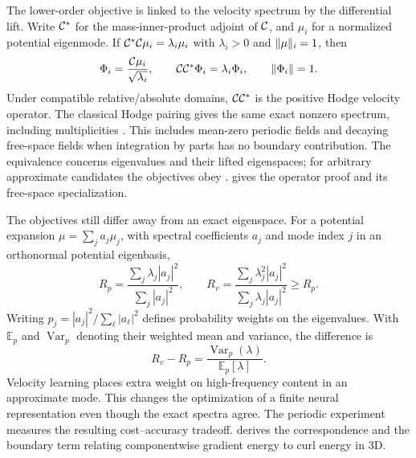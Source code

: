 The lower-order objective is linked to the velocity spectrum by the differential lift. Write $\mathcal C^*$ for the mass-inner-product adjoint of $\mathcal C$, and $\mu_i$ for a normalized potential eigenmode. If $\mathcal C^*\mathcal C\mu_i=\lambda_i\mu_i$ with $\lambda_i>0$ and $\lVert \mu\rVert_i=1$, then
\begin{equation}
\Phi_i=\frac{\mathcal C\mu_i}{\sqrt{\lambda_i}},\qquad
\mathcal C\mathcal C^*\Phi_i=\lambda_i\Phi_i,\qquad \lVert \Phi_i\rVert=1.
\label{eq:paired-lift}
\end{equation}
\begingroup
Under compatible relative/absolute domains, $\mathcal C\mathcal C^*$ is the positive Hodge velocity operator. The classical Hodge pairing gives the same exact nonzero spectrum, including multiplicities \citep{arnold2006finite}. This includes mean-zero periodic fields and decaying free-space fields when integration by parts has no boundary contribution. The equivalence concerns eigenvalues and their lifted eigenspaces; for arbitrary approximate candidates the objectives obey .  gives the operator proof and its free-space specialization.
\par\endgroup


The objectives still differ away from an exact eigenspace. For a potential expansion $\mu=\sum_j a_j\mu_j$, with spectral coefficients $a_j$ and mode index $j$ in an orthonormal potential eigenbasis,
\begin{equation}
R_p=\frac{\sum_j\lambda_j|a_j|^2}{\sum_j|a_j|^2},\qquad
R_v=\frac{\sum_j\lambda_j^2|a_j|^2}{\sum_j\lambda_j|a_j|^2}\ge R_p.
\label{eq:moments}
\end{equation}
Writing $p_j=|a_j|^2/\sum_\ell|a_\ell|^2$ defines probability weights on the eigenvalues. With $\mathbb E_p$ and $\operatorname{Var}_p$ denoting their weighted mean and variance, the difference is
\begin{equation}
R_v-R_p=\frac{\operatorname{Var}_p(\lambda)}{\mathbb E_p[\lambda]}.
\label{eq:variance}
\end{equation}
Velocity learning places extra weight on high-frequency content in an approximate mode. This changes the optimization of a finite neural representation even though the exact spectra agree. The periodic experiment measures the resulting cost--accuracy tradeoff.  derives the correspondence and the boundary term relating componentwise gradient energy to curl energy in 3D.


